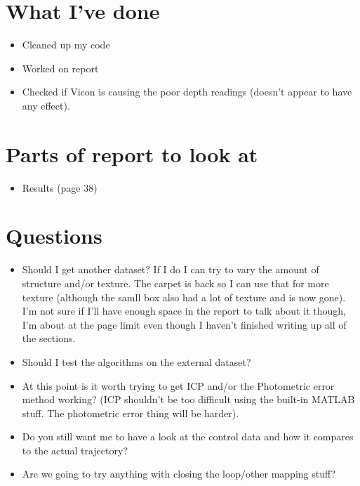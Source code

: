 \documentclass[12pt,a4paper]{article}
\begin{document}
\author{Katrina Ashton}


\pagestyle{fancy}
\fancyhf{}
\rhead{\thepage}

\section{What I've done}
\begin{itemize}
  \item Cleaned up my code
  \item Worked on report
  \item Checked if Vicon is causing the poor depth readings (doesn't appear to have any effect).
\end{itemize}

\section{Parts of report to look at}
\begin{itemize}
\item Results (page 38)
\end{itemize}

\section{Questions}
\begin{itemize}
\item Should I get another dataset? If I do I can try to vary the amount of structure and/or texture. The carpet is back so I can use that for more texture (although the samll box also had a lot of texture and is now gone). I'm not sure if I'll have enough space in the report to talk about it though, I'm about at the page limit even though I haven't finished writing up all of the sections.
\item Should I test the algorithms on the external dataset?
\item At this point is it worth trying to get ICP and/or the Photometric error method working? (ICP shouldn't be too difficult using the built-in MATLAB stuff. The photometric error thing will be harder).
\item Do you still want me to have a look at the control data and how it compares to the actual trajectory?
\item Are we going to try anything with closing the loop/other mapping stuff?
\end{itemize}
\end{document}
